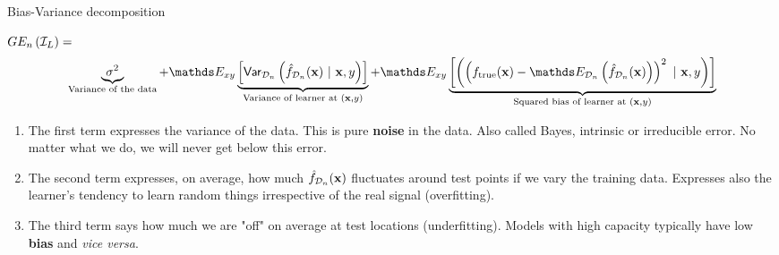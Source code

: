 \documentclass[11pt,compress,t,notes=noshow, xcolor=table]{beamer}
\begin{document}
\begin{vbframe} {Bias-Variance decomposition}
\begin{footnotesize}
$GE_n\left(\mathcal{I}_{L}\right) =$  
$$
 \underbrace{\sigma^2}_{\text{Variance of the data}} + \E_{xy}\underbrace{\left[\var_{\D_n}\left(\fh_{\D_n}(\xv) ~|~\xv, y\right)\right]}_{\text{Variance of learner at } (\xv, y)} + \E_{xy}\underbrace{\left[\left(\left(\ftrue(\xv)-\E_{\D_n}\left(\fh_{\D_n}(\xv)\right)\right)^2~|~\xv, y\right)\right]}_{\text{Squared bias of learner at } (\xv, y)}  
$$
\end{footnotesize}
\begin{enumerate}
  \item The first term expresses the variance of the data. 
    This is pure \textbf{noise} in the data.
    Also called Bayes, intrinsic or irreducible error.
    No matter what we do, we will never get below this error.
  \item The second term expresses, on average, how much $\hat{f}_{\mathcal{D}_n}(\mathbf{x})$ fluctuates around test points if we vary the training data. Expresses also the learner's tendency to learn random things irrespective of the real signal (overfitting).
  \item The third term says how much we are "off" on average at test locations (underfitting).
    Models with high capacity typically have low \textbf{bias} and \textit{vice versa}.
\end{enumerate}











\end{vbframe}
\end{document}
